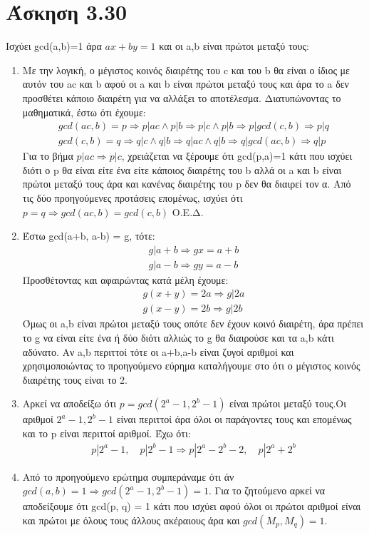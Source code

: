 \documentclass[12pt]{article}
\numberwithin{equation}{section}
\begin{document}
\section {Άσκηση 3.30}
Ισχύει gcd(a,b)=1 άρα \(ax + by = 1\) και οι a,b είναι πρώτοι μεταξύ τους:
\begin{enumerate} 
\item Με την λογική, ο μέγιστος κοινός διαιρέτης του c και του b θα είναι ο ίδιος με αυτόν του ac και b αφού οι a και b είναι πρώτοι μεταξύ τους και άρα το a δεν προσθέτει κάποιο διαιρέτη για να αλλάξει το αποτέλεσμα.
Διατυπώνοντας το μαθηματικά, έστω ότι έχουμε:
\begin{align*}
    gcd(ac,b) = p \Rightarrow p | ac \land p | b \Rightarrow p | c \land p | b \Rightarrow p | gcd(c,b) \Rightarrow p | q\\
    gcd(c,b) = q \Rightarrow q | c \land q | b \Rightarrow q | ac \land  q | b \Rightarrow q | gcd(ac,b) \Rightarrow q | p
\end{align*}
Για το βήμα \(p|ac \Rightarrow p|c\), χρειάζεται να ξέρουμε ότι gcd(p,a)=1 κάτι που ισχύει διότι ο p θα είναι είτε ένα είτε κάποιος διαιρέτης του b αλλά οι a και b είναι πρώτοι μεταξύ τους άρα και κανένας διαιρέτης του p δεν θα διαιρεί τον α. 
Από τις δύο προηγούμενες προτάσεις επομένως, ισχύει ότι \(p=q \Rightarrow gcd(ac,b)=gcd(c,b)\) Ο.Ε.Δ.

\item Έστω gcd(a+b, a-b) = g, τότε:
\begin{align*}
    g | a+b \Rightarrow gx = a+b \\
    g | a-b \Rightarrow gy = a-b
\end{align*}
Προσθέτοντας και αφαιρώντας κατά μέλη έχουμε:
\begin{align*}
    g(x+y) = 2a \Rightarrow g | 2a\\
    g(x-y) = 2b \Rightarrow g | 2b
\end{align*}
Όμως οι a,b είναι πρώτοι μεταξύ τους οπότε δεν έχουν κοινό διαιρέτη, άρα πρέπει το g να είναι είτε ένα ή δύο διότι αλλιώς το g θα διαιρούσε και τα a,b κάτι αδύνατο.
Αν a,b περιττοί τότε οι a+b,a-b είναι ζυγοί αριθμοί και χρησιμοποιώντας το προηγούμενο εύρημα καταλήγουμε στο ότι ο μέγιστος κοινός διαιρέτης τους είναι το 2.

\item Αρκεί να αποδείξω ότι \(p = gcd(2^a-1, 2^b-1)\) είναι πρώτοι μεταξύ τους.Οι αριθμοί \(2^a-1, 2^b-1\) είναι περιττοί άρα όλοι οι παράγοντες τους και επομένως και το p είναι περιττοί αριθμοί. Έχω ότι:
\begin{align*}
    p | 2^a-1, \quad p | 2^b-1 \Rightarrow p | 2^a - 2^b - 2, \quad p | 2^a + 2^b
\end{align*}

\item Από το προηγούμενο ερώτημα συμπεράναμε ότι άν \\ \(gcd(a, b) = 1 \Rightarrow gcd(2^a - 1,2^b -1) =1\). Για το ζητούμενο αρκεί να αποδείξουμε ότι gcd(p, q) = 1 κάτι που ισχύει αφού όλοι οι πρώτοι αριθμοί είναι και πρώτοι με όλους τους άλλους ακέραιους άρα και \(gcd(M_p, M_q)=1\).
\end{enumerate}
\end{document}
